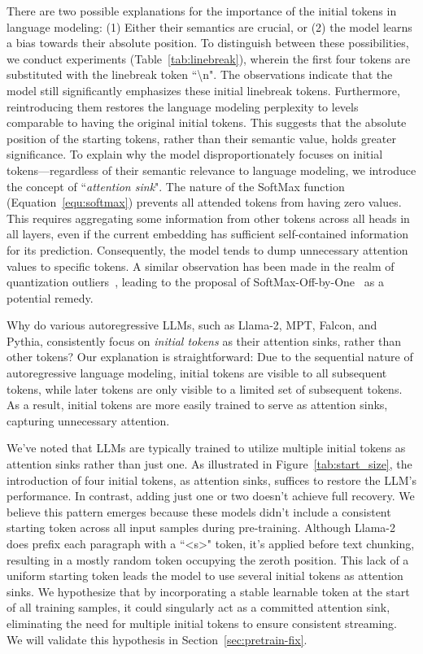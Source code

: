 There are two possible explanations for the importance of the initial tokens in language modeling: (1) Either their semantics are crucial, or 
(2) the model learns a bias towards their absolute position. To distinguish between these possibilities, we conduct experiments (Table~\ref{tab:linebreak}), wherein the first four tokens are substituted with the linebreak token ``\textbackslash n". The observations indicate that the model still significantly emphasizes these initial linebreak tokens. Furthermore, reintroducing them restores the language modeling perplexity to levels comparable to having the original initial tokens. This suggests that the absolute position of the starting tokens, rather than their semantic value, holds greater significance.
\vspace{-0.5em}
\label{sec:attention_sink}
To explain why the model disproportionately focuses on initial tokens—regardless of their semantic relevance to language modeling, we introduce the concept of ``\emph{attention sink}". The nature of the SoftMax function (Equation~\ref{equ:softmax}) prevents all attended tokens from having zero values. This requires aggregating some information from other tokens across all heads in all layers, even if the current embedding has sufficient self-contained information for its prediction. Consequently, the model tends to dump unnecessary attention values to specific tokens. A similar observation has been made in the realm of quantization outliers~\citep{xiao2023smoothquant,bondarenko2023quantizable}, leading to the proposal of SoftMax-Off-by-One~\citep{softmax1} as a potential remedy.

Why do various autoregressive LLMs, such as Llama-2, MPT, Falcon, and Pythia, consistently focus on \textit{initial tokens} as their attention sinks, rather than other tokens? Our explanation is straightforward: Due to the sequential nature of autoregressive language modeling, initial tokens are visible to all subsequent tokens, while later tokens are only visible to a limited set of subsequent tokens. As a result, initial tokens are more easily trained to serve as attention sinks, capturing unnecessary attention.

We've noted that LLMs are typically trained to utilize multiple initial tokens as attention sinks rather than just one. As illustrated in Figure~\ref{tab:start_size}, the introduction of four initial tokens, as attention sinks, suffices to restore the LLM's performance. In contrast, adding just one or two doesn't achieve full recovery. We believe this pattern emerges because these models didn't include a consistent starting token across all input samples during pre-training. Although Llama-2 does prefix each paragraph with a ``<s>" token, it's applied before text chunking, resulting in a mostly random token occupying the zeroth position. This lack of a uniform starting token leads the model to use several initial tokens as attention sinks. We hypothesize that by incorporating a stable learnable token at the start of all training samples, it could singularly act as a committed attention sink, eliminating the need for multiple initial tokens to ensure consistent streaming. We will validate this hypothesis in Section~\ref{sec:pretrain-fix}.

